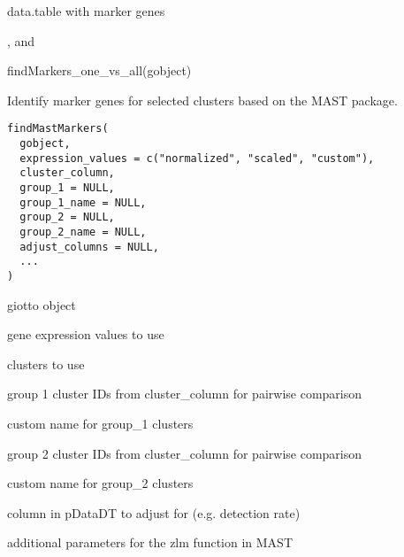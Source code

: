 \documentclass[a4paper]{book}
\begin{document}
%
\begin{Value}
data.table with marker genes
\end{Value}
%
\begin{SeeAlso}\relax
{},  and 
\end{SeeAlso}
%
\begin{Examples}
\begin{ExampleCode}
    findMarkers_one_vs_all(gobject)
\end{ExampleCode}
\end{Examples}
%
\begin{Description}\relax
Identify marker genes for selected clusters based on the MAST package.
\end{Description}
%
\begin{Usage}
\begin{verbatim}
findMastMarkers(
  gobject,
  expression_values = c("normalized", "scaled", "custom"),
  cluster_column,
  group_1 = NULL,
  group_1_name = NULL,
  group_2 = NULL,
  group_2_name = NULL,
  adjust_columns = NULL,
  ...
)
\end{verbatim}
\end{Usage}
%
\begin{Arguments}
\begin{ldescription}
\item[\code{gobject}] giotto object

\item[\code{expression\_values}] gene expression values to use

\item[\code{cluster\_column}] clusters to use

\item[\code{group\_1}] group 1 cluster IDs from cluster\_column for pairwise comparison

\item[\code{group\_1\_name}] custom name for group\_1 clusters

\item[\code{group\_2}] group 2 cluster IDs from cluster\_column for pairwise comparison

\item[\code{group\_2\_name}] custom name for group\_2 clusters

\item[\code{adjust\_columns}] column in pDataDT to adjust for (e.g. detection rate)

\item[\code{...}] additional parameters for the zlm function in MAST
\end{ldescription}
\end{Arguments}
\end{document}
